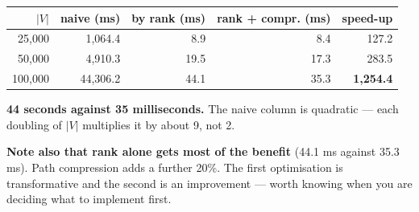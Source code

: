 \begin{worked}
\begin{center}
\begin{tabular}{@{}rrrrr@{}}
\toprule
\rowcolor{primary!15}
$|V|$ & naive (ms) & by rank (ms) & rank + compr. (ms) & speed-up \\
\midrule
 25{,}000 &  1{,}064.4 &  8.9 &  8.4 &   127.2 \\
 50{,}000 &  4{,}910.3 & 19.5 & 17.3 &   283.5 \\
100{,}000 & 44{,}306.2 & 44.1 & 35.3 & \textbf{1{,}254.4} \\
\bottomrule
\end{tabular}
\end{center}

\smallskip
\textbf{44 seconds against 35 milliseconds.} The naive column is quadratic ---
each doubling of $|V|$ multiplies it by about 9, not 2.

\smallskip
\textbf{Note also that rank alone gets most of the benefit} (44.1 ms against
35.3 ms). Path compression adds a further 20\%. The first optimisation is
transformative and the second is an improvement --- worth knowing when you are
deciding what to implement first.
\end{worked}

